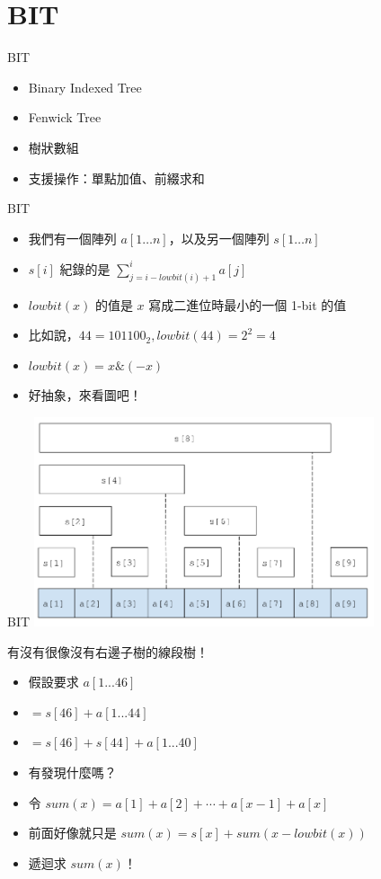 \documentclass[standalone]{beamer}
\begin{document}
\section{BIT}

\begin{frame}{BIT}
  \begin{itemize}
    \item Binary Indexed Tree
    \item Fenwick Tree
    \item 樹狀數組
    \item 支援操作：單點加值、前綴求和
  \end{itemize}
\end{frame}

\begin{frame}{BIT}
  \begin{itemize}
    \item 我們有一個陣列 $a[1\ldots n]$，以及另一個陣列 $s[1\ldots n]$
    \item $s[i]$ 紀錄的是 $\sum_{j=i-lowbit(i)+1}^{i}{a[j]}$
    \item $lowbit(x)$ 的值是 $x$ 寫成二進位時最小的一個 1-bit 的值
    \item 比如說，$44 = 101100_2, lowbit(44) = 2^2 = 4$
    \item $lowbit(x) = x \& (-x)$
    \item 好抽象，來看圖吧！
  \end{itemize}
\end{frame}

\begin{frame}{BIT}
  \includegraphics[width=10cm]{figures/bit.png}

  有沒有很像沒有右邊子樹的線段樹！
\end{frame}

\begin{frame}{}
  \begin{itemize}
    \item 假設要求 $a[1...46]$
    \item $= s[46] + a[1...44]$
    \item $= s[46] + s[44] + a[1...40]$
    \item 有發現什麼嗎？
    \item 令 $sum(x)=a[1]+a[2]+\cdots+a[x-1]+a[x]$
    \item 前面好像就只是 $sum(x) = s[x] + sum(x - lowbit(x))$
    \item 遞迴求 $sum(x)$！
  \end{itemize}
\end{frame}
\end{document}
